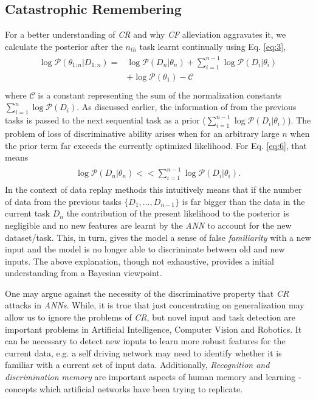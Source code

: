 \documentclass{article}
\begin{document}
\subsection{Catastrophic Remembering}\label{cr}




For a better understanding of \textit{CR} and why \textit{CF} alleviation aggravates it, we calculate the posterior after the $n_{th}$ task learnt continually using Eq. \eqref{eq:3},
\begin{eqnarray}
    \begin{aligned}
    \log \mathcal{P}(\theta_{1:n}|D_{1:n}) =   &\log \mathcal{P}(D_n|\theta_n)+\sum_{i=1}^{n-1}\log \mathcal{P}(D_i|\theta_i)\\
                                                 &+\log\mathcal{P}(\theta_1)-\mathcal{C} \label{eq:6}\\
    \end{aligned}
\end{eqnarray}
where $\mathcal{C}$ is a constant representing the sum of the normalization constants $\sum_{i=1}^n\log \mathcal{P}(D_i)$. As discussed earlier, the information of from the previous tasks is passed to the next sequential task as a prior ($\sum_{i=1}^{n-1}\log \mathcal{P}(D_i|\theta_i)$). The problem of loss of discriminative ability arises when for an arbitrary large $n$ when the prior term far exceeds the currently optimized likelihood. For Eq. \eqref{eq:6}, that means
\begin{eqnarray}
    \begin{aligned}
    \log \mathcal{P}(D_n|\theta_n) << \sum_{i=1}^{n-1}\log \mathcal{P}(D_i|\theta_i).
    \end{aligned}
\end{eqnarray}
In the context of data replay methods this intuitively means that if the number of data from the previous tasks $\{D_1,\dots,D_{n-1}\}$ is far bigger than the data in the current task $D_n$
the contribution of the present likelihood to the posterior is negligible and no new features are learnt by the \textit{ANN} to account for the new dataset/task. 
This, in turn, gives the model a sense of false \textit{familiarity} with a new input and the model is no longer able to discriminate between old and new inputs. 
The above explanation, though not exhaustive, provides a initial understanding from a Bayesian viewpoint. 

One may argue against the necessity of the discriminative property that \textit{CR} attacks in \textit{ANNs}. While, it is true that just concentrating on generalization may allow us to ignore the problems of \textit{CR}, but novel input and task detection
are important problems in Artificial Intelligence, Computer Vision and Robotics.
It can be necessary to detect new inputs to learn more robust features for the current data, e.g. a self driving network may need to identify whether it is familiar with a current set of input data. 
Additionally, \textit{Recognition and discrimination memory} are important aspects of human memory and learning - concepts which artificial networks have been trying to replicate. 
\end{document}
